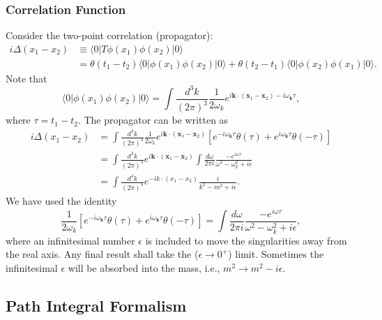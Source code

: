 \subsubsection{Correlation Function}
Consider the two-point correlation (propagator):
\begin{equation}
\begin{aligned}
	i\Delta(x_1-x_2) &\equiv \langle 0|T \phi(x_1) \phi(x_2) |0\rangle \\
	&= \theta(t_1-t_2) \langle 0|\phi(x_1) \phi(x_2) |0\rangle 
	+ \theta(t_2-t_1) \langle 0|\phi(x_2) \phi(x_1) |0\rangle.
\end{aligned}
\end{equation}
Note that
\begin{equation}
	\langle 0|\phi(x_1) \phi(x_2) |0\rangle
	= \int\frac{d^{3} k}{(2\pi)^{3}}\frac{1}{2\omega_k} e^{i\bm k\cdot (\bm x_1-\bm x_2)-i\omega_{\bm k}\tau},
\end{equation}
where $\tau =t_1-t_2$.
The propagator can be written as
\begin{equation}
\begin{aligned}
	i\Delta(x_1-x_2) 
	&= \int\frac{d^{3} k}{(2\pi)^{3}}\frac{1}{2\omega_k} e^{i\bm k\cdot (\bm x_1-\bm x_2)}\left[e^{-i\omega_{\bm k}\tau}\theta(\tau)+e^{i\omega_{\bm k}\tau}\theta(-\tau)\right] \\
	&= \int\frac{d^{3} k}{(2\pi)^{3}} e^{i\bm k\cdot (\bm x_1-\bm x_2)}\int \frac{d\omega}{2\pi i}\frac{-e^{i\omega\tau}}{\omega^2-\omega_k^2+i\epsilon} \\
	&= \int\frac{d^{4} k}{(2\pi)^{4}} e^{-i k\cdot (x_1-x_2)}\frac{i}{k^2-m^2+i\epsilon}.
\end{aligned}
\end{equation}
We have used the identity
\begin{equation*}
	\frac{1}{2\omega_k} \left[e^{-i\omega_{\bm k}\tau}\theta(\tau)+e^{i\omega_{\bm k}\tau}\theta(-\tau)\right] 
	= \int \frac{d\omega}{2\pi i} \frac{-e^{i\omega\tau}}{\omega^2-\omega_k^2+i\epsilon},
\end{equation*}
where an infinitesimal number $\epsilon$ is included to move the singularities away from the real axis.
Any final result shall take the ($\epsilon \rightarrow 0^+$) limit.
Sometimes the infinitesimal $\epsilon$ will be absorbed into the mass, i.e., $m^2 \rightarrow m^2-i\epsilon$.



\subsection{Path Integral Formalism}

